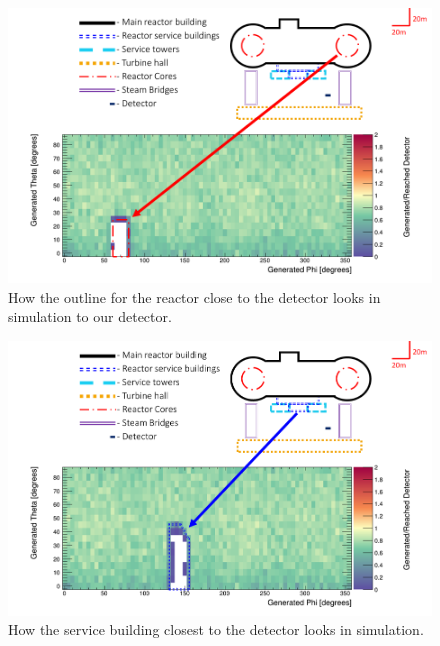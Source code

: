 \newpage
\begin{figure}[htbp]
  \centering
  \begin{turn}{-90}
  \begin{minipage}{9in}
  \centering
    \includegraphics[scale = 0.8]{Chapter5/Figs/wylfaRasterNew/reactorCoreNearGen_Reached.png}
  \caption{How the outline for the reactor close to the detector looks in simulation to our detector.}
  \label{fig:reactorCoreNearGen_Reached}
  \end{minipage}
  \end{turn}
\end{figure}


\newpage
\begin{figure}[htbp]
  \centering
  \begin{turn}{-90}
  \begin{minipage}{9in}
  \centering
    \includegraphics[scale = 0.8]{Chapter5/Figs/wylfaRasterNew/serviceBuildClose.png}
  \caption{How the service building closest to the detector looks in simulation.}
  \label{fig:serviceBuildClose}
  \end{minipage}
  \end{turn}
\end{figure}

